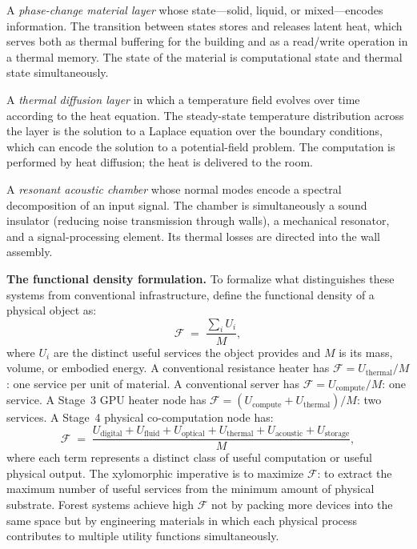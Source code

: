 \documentclass[12pt, oneside]{article}
\begin{document}
A \emph{phase-change material layer} whose state---solid, liquid, or mixed---encodes information. The transition between states stores and releases latent heat, which serves both as thermal buffering for the building and as a read/write operation in a thermal memory. The state of the material is computational state and thermal state simultaneously.

A \emph{thermal diffusion layer} in which a temperature field evolves over time according to the heat equation. The steady-state temperature distribution across the layer is the solution to a Laplace equation over the boundary conditions, which can encode the solution to a potential-field problem. The computation is performed by heat diffusion; the heat is delivered to the room.

A \emph{resonant acoustic chamber} whose normal modes encode a spectral decomposition of an input signal. The chamber is simultaneously a sound insulator (reducing noise transmission through walls), a mechanical resonator, and a signal-processing element. Its thermal losses are directed into the wall assembly.

\textbf{The functional density formulation.} To formalize what distinguishes these systems from conventional infrastructure, define the functional density of a physical object as:
\[
\mathcal{F} \;=\; \frac{\sum_i U_i}{M},
\]
where $U_i$ are the distinct useful services the object provides and $M$ is its mass, volume, or embodied energy. A conventional resistance heater has $\mathcal{F} = U_{\text{thermal}} / M$: one service per unit of material. A conventional server has $\mathcal{F} = U_{\text{compute}} / M$: one service. A Stage~3 GPU heater node has $\mathcal{F} = (U_{\text{compute}} + U_{\text{thermal}}) / M$: two services. A Stage~4 physical co-computation node has:
\[
\mathcal{F} \;=\; \frac{U_{\text{digital}} + U_{\text{fluid}} + U_{\text{optical}} + U_{\text{thermal}} + U_{\text{acoustic}} + U_{\text{storage}}}{M},
\]
where each term represents a distinct class of useful computation or useful physical output. The xylomorphic imperative is to maximize $\mathcal{F}$: to extract the maximum number of useful services from the minimum amount of physical substrate. Forest systems achieve high $\mathcal{F}$ not by packing more devices into the same space but by engineering materials in which each physical process contributes to multiple utility functions simultaneously.
\end{document}
